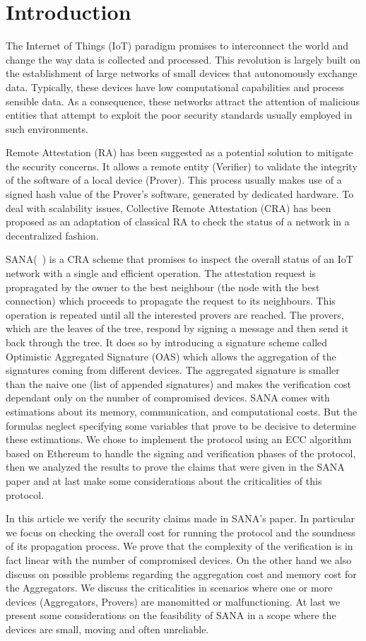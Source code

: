 \section{Introduction}

The Internet of Things (IoT) paradigm promises to interconnect the world and
change the way data is collected and processed.
This revolution is largely built on the establishment of large networks of small 
devices that autonomously exchange data.
Typically, these devices have low computational capabilities and process
sensible data.
As a consequence, these networks attract the attention of malicious entities
that attempt to exploit the poor security standards usually employed in such
environments.

Remote Attestation (RA) has been suggested as a potential solution to mitigate the
security concerns.
It allows a remote entity (\ie Verifier) to validate the integrity of
the software of a local device (\ie Prover).
This process usually makes use of a signed hash value of the Prover’s software, 
generated by dedicated hardware.
To deal with scalability issues, Collective Remote Attestation (CRA) has 
been proposed as an adaptation of classical RA to check the status of a network 
in a decentralized fashion.

SANA(~\cite{sana}) is a CRA scheme that promises to inspect the overall
status of an IoT network with a single and efficient operation.
The attestation request is propragated by the owner to the best neighbour (\ie the node with the best connection) which proceeds to propagate the request to its neighbours.
This operation is repeated until all the interested provers are reached.
The provers, which are the leaves of the tree, respond by signing a message and then send it back through the tree.
It does so by introducing a signature scheme called Optimistic Aggregated
Signature (OAS) which allows the aggregation of the signatures coming from
different devices.
The aggregated signature is smaller than the naive one (\ie list of appended
signatures) and makes the verification cost dependant only on the number of
compromised devices.
SANA comes with estimations about its memory, communication, and computational costs. But the formulas neglect specifying some variables that prove to be decisive to determine these estimations.
We chose to implement the protocol using an ECC algorithm based on Ethereum to handle the signing and verification phases of the protocol, then we analyzed the results to prove the claims that were given in the SANA paper and at last make some considerations about the criticalities of this protocol.

In this article we verify the security claims made in SANA's paper.
In particular we focus on checking the overall cost for running the protocol
and the soundness of its propagation process.
We prove that the complexity of the verification is in fact linear with the number of compromised devices.
On the other hand we also discuss on possible problems regarding the aggregation cost and memory cost for the Aggregators.
We discuss the criticalities in scenarios where one or more devices (\eg Aggregators, Provers) are manomitted or malfunctioning.
At last we present some considerations on the feasibility of SANA in a scope where the devices are small, moving and often unreliable.